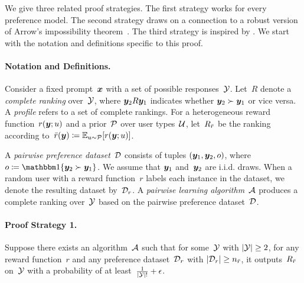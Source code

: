 \begin{proofEnd}
    We give three related proof strategies. The first strategy works for every preference model. The second strategy draws on a connection to a robust version of Arrow's impossibility theorem~\citep{friedgut2002boolean}. The third strategy is inspired by \citet{procaccia2025clone}. We start with the notation and definitions specific to this proof. 
    
    \paragraph{Notation and Definitions.}
    Consider a fixed prompt~${\bm{x}}$ with a set of possible responses~${\mathcal{Y}}$. Let~$R$ denote a \emph{complete ranking} over~${\mathcal{Y}}$, where ${\bm{y}}_2 R {\bm{y}}_1$ indicates whether ${\bm{y}}_2 \succ {\bm{y}}_1$ or vice versa. A \emph{profile} refers to a set of complete rankings. For a heterogeneous reward function~$r({\bm{y}}; u)$ and a prior~${\mathcal{P}}$ over user types~${\mathcal{U}}$, let~$R_{\bar{r}}$ be the ranking according to~${\bar{r}}({\bm{y}}) \coloneqq \mathbb{E}_{u\sim{\mathcal{P}}}[r({\bm{y}}; u)]$.
    
    A \emph{pairwise preference dataset}~${\mathcal{D}}$ consists of tuples $({\bm{y}}_1, {\bm{y}}_2, o)$, where $o \coloneqq \One\{\vy_2 \succ \vy_1\}$. We assume that ${\bm{y}}_1$ and~${\bm{y}}_2$ are i.i.d. draws. When a random user with a reward function~$r$ labels each instance in the dataset, we denote the resulting dataset by~${\mathcal{D}}_r$. A \emph{pairwise learning algorithm}~${\mathcal{A}}$ produces a complete ranking over~${\mathcal{Y}}$ based on the pairwise preference dataset~${\mathcal{D}}$. 

    \paragraph{Proof Strategy 1.}
    Suppose there exists an algorithm~${\mathcal{A}}$ such that for some~${\mathcal{Y}}$ with $|{\mathcal{Y}}| \ge 2$, for any reward function~$r$ and any preference dataset~${\mathcal{D}}_r$ with $|{\mathcal{D}}_r| \ge n_{\bar{r}}$, it outputs~$R_{\bar{r}}$ on~${\mathcal{Y}}$ with a probability of at least~$\frac{1}{|{\mathcal{Y}}|!} + \epsilon$.
    

\end{proofEnd}
